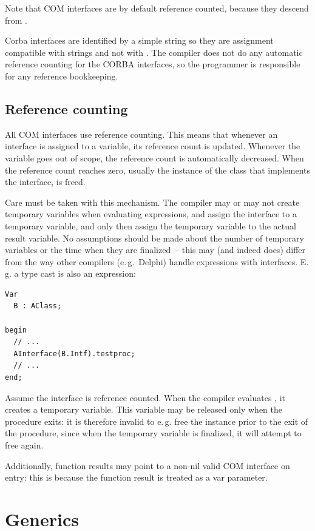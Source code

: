 Note that COM interfaces are by default reference counted, because they
descend from .

Corba interfaces are identified by a simple string so they are assignment
compatible with strings and not with . The compiler does not do
any automatic reference counting for the CORBA interfaces, so the programmer
is responsible for any reference bookkeeping.

\section{Reference counting}
All COM interfaces use reference counting.  This means that whenever an
interface is assigned to a variable, its reference count is updated.
Whenever the variable goes out of scope, the reference count is
automatically decreased. When the reference count reaches zero, usually the
instance of the class that implements the interface, is freed.

Care must be taken with this mechanism. The compiler may or may not create
temporary variables when evaluating expressions, and assign the interface
to a temporary variable, and only then assign the temporary variable to
the actual result variable. No assumptions should be made about the number
of temporary variables or the time when they are finalized~-- this may
(and indeed does) differ from the way other compilers (e.\,g.\ Delphi) handle
expressions with interfaces. E.\,g. a type cast is also an expression:
\begin{verbatim}
Var
  B : AClass;

begin
  // ...
  AInterface(B.Intf).testproc;
  // ...
end;
\end{verbatim}
Assume the interface  is reference counted. When the compiler
evaluates , it creates a temporary variable. This variable may be
released only when the procedure exits: it is therefore invalid to e.\,g.
free the instance  prior to the exit of the procedure, since when the
temporary variable is finalized, it will attempt to free  again.

Additionally, function results may point to a non-nil valid COM interface on
entry: this is because the function result is treated as a var parameter.

\chapter{Generics}
\label{ch:generics}
